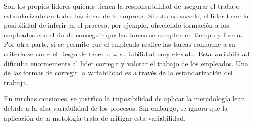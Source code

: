 Son los propios líderes quienes tienen la responsabilidad de asegurar el trabajo estandarizado en todas las áreas de la empresa. Si esto no sucede, el líder tiene la posibilidad de inferir en el proceso, por ejemplo, ofreciendo formación a los empleados con el fin de conseguir que las tareas se cumplan en tiempo y forma. Por otra parte, si se permite que el empleado realice las tareas conforme a su criterio se corre el riesgo de tener una variabilidad muy elevada. Esta variabilidad dificulta enormemente al lider corregir y valorar el trabajo de los empleados. Una de las formas de corregir la variabilidad es a través de la estandarización del trabajo.

En muchas ocasiones, se justifica la imposibilidad de aplicar la metodología lean debido a la alta variabilidad de los procesos. Sin embargo, se ignora que la aplicación de la metología trata de mitigar esta variabilidad.




